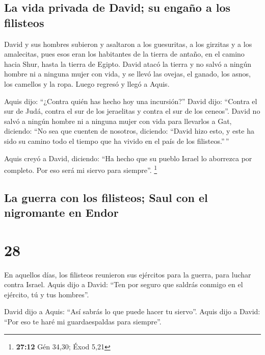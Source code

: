 \hypertarget{la-vida-privada-de-david-su-engauxf1o-a-los-filisteos}{%
\subsection{La vida privada de David; su engaño a los
filisteos}\label{la-vida-privada-de-david-su-engauxf1o-a-los-filisteos}}

 David y sus hombres subieron y asaltaron a los
guesuritas, a los girzitas y a los amalecitas, pues esos eran los
habitantes de la tierra de antaño, en el camino hacia Shur, hasta la
tierra de Egipto.  David atacó la tierra y no salvó a
ningún hombre ni a ninguna mujer con vida, y se llevó las ovejas, el
ganado, los asnos, los camellos y la ropa. Luego regresó y llegó a
Aquis.

 Aquis dijo: ``¿Contra quién has hecho hoy una
incursión?'' David dijo: ``Contra el sur de Judá, contra el sur de los
jeraelitas y contra el sur de los ceneos''.  David no
salvó a ningún hombre ni a ninguna mujer con vida para llevarlos a Gat,
diciendo: ``No sea que cuenten de nosotros, diciendo: ``David hizo esto,
y este ha sido su camino todo el tiempo que ha vivido en el país de los
filisteos.''\,''

 Aquis creyó a David, diciendo: ``Ha hecho que su pueblo
Israel lo aborrezca por completo. Por eso será mi siervo para siempre''.
\footnote{\textbf{27:12} Gén 34,30; Éxod 5,21}

\hypertarget{la-guerra-con-los-filisteos-saul-con-el-nigromante-en-endor}{%
\subsection{La guerra con los filisteos; Saul con el nigromante en
Endor}\label{la-guerra-con-los-filisteos-saul-con-el-nigromante-en-endor}}

\hypertarget{section-27}{%
\section{28}\label{section-27}}

 En aquellos días, los filisteos reunieron sus ejércitos
para la guerra, para luchar contra Israel. Aquis dijo a David: ``Ten por
seguro que saldrás conmigo en el ejército, tú y tus hombres''.

 David dijo a Aquis: ``Así sabrás lo que puede hacer tu
siervo''. Aquis dijo a David: ``Por eso te haré mi guardaespaldas para
siempre''.

